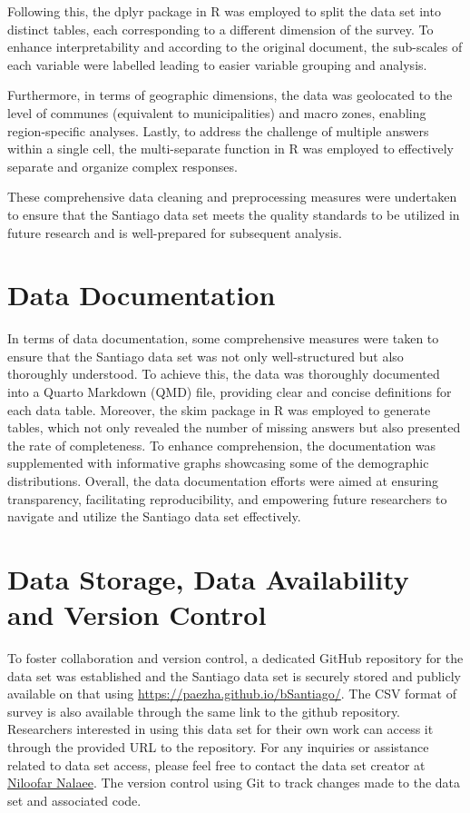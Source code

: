 \documentclass[
11pt, %
oneside, %
english, %
singlespacing, %
]{macthesis} %
\begin{document}
Following this, the dplyr package in R was employed to split the data set into distinct tables, each corresponding to a different dimension of the survey. To enhance interpretability and according to the original document, the sub-scales of each variable were labelled leading to easier variable grouping and analysis.

Furthermore, in terms of geographic dimensions, the data was geolocated to the level of communes (equivalent to municipalities) and macro zones, enabling region-specific analyses. Lastly, to address the challenge of multiple answers within a single cell, the multi-separate function in R was employed to effectively separate and organize complex responses.

These comprehensive data cleaning and preprocessing measures were undertaken to ensure that the Santiago data set meets the quality standards to be utilized in future research and is well-prepared for subsequent analysis.

\hypertarget{data-documentation}{%
\section{Data Documentation}\label{data-documentation}}

In terms of data documentation, some comprehensive measures were taken to ensure that the Santiago data set was not only well-structured but also thoroughly understood. To achieve this, the data was thoroughly documented into a Quarto Markdown (QMD) file, providing clear and concise definitions for each data table. Moreover, the skim package in R was employed to generate tables, which not only revealed the number of missing answers but also presented the rate of completeness. To enhance comprehension, the documentation was supplemented with informative graphs showcasing some of the demographic distributions. Overall, the data documentation efforts were aimed at ensuring transparency, facilitating reproducibility, and empowering future researchers to navigate and utilize the Santiago data set effectively.

\hypertarget{data-storage-data-availability-and-version-control}{%
\section{Data Storage, Data Availability and Version Control}\label{data-storage-data-availability-and-version-control}}

To foster collaboration and version control, a dedicated GitHub repository for the data set was established and the Santiago data set is securely stored and publicly available on that using \url{https://paezha.github.io/bSantiago/}. The CSV format of survey is also available through the same link to the github repository. Researchers interested in using this data set for their own work can access it through the provided URL to the repository. For any inquiries or assistance related to data set access, please feel free to contact the data set creator at \href{niloofar.nalaee@gmail.com}{Niloofar Nalaee}. The version control using Git to track changes made to the data set and associated code.
\end{document}
